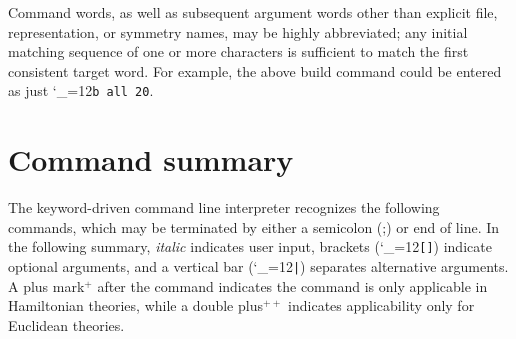 \documentclass [12pt]{article}
\makeatletter
\renewcommand{\tt}{\begingroup\catcode`_=12\def\_{\string_}\tt@}
\newcommand{\tt@}[1]{\texttt{#1}\endgroup}
\makeatother
\begin{document}
Command words, as well as subsequent argument words
other than explicit file, representation, or symmetry names,
may be highly abbreviated;
any initial matching sequence of one or more characters is sufficient
to match the first consistent target word.
For example, the above build command could be entered as just \tt{b all 20}.

\section {Command summary}\label{sec:commands}

The keyword-driven command line interpreter recognizes the following commands,
which may be terminated by either a semicolon (;) or end of line.
In the following summary,
\textit{italic} indicates user input,
brackets (\tt{[]}) indicate optional arguments,
and a vertical bar (\tt{|}) separates alternative arguments.
A plus mark$^+$ after the command indicates the command is only
applicable in Hamiltonian theories, while a double plus$^{++}$
indicates applicability only for Euclidean theories.
\end{document}
